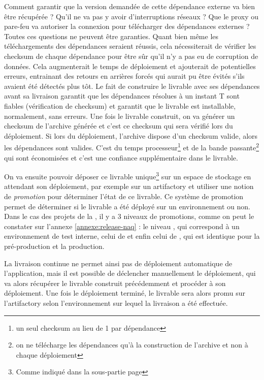 Comment garantir que la version demandée de cette dépendance externe va bien être récupérée ? Qu'il ne va pas y avoir d'interruptions réseaux ? Que le proxy ou pare-feu va autoriser la connexion pour télécharger des dépendances externes ? Toutes ces questions ne peuvent être garanties. Quant bien même les téléchargements des dépendances seraient réussis, cela nécessiterait de vérifier les \gls{checksum} de chaque dépendance pour être sûr qu'il n'y a pas eu de corruption de données. Cela augmenterait le temps de déploiement et ajouterait de potentielles erreurs, entrainant des retours en arrières forcés qui aurait pu être évités s'ils avaient été détectés plus tôt. Le fait de construire le livrable avec ses dépendances avant sa livraison garantit que les dépendances résolues à un instant T sont fiables (vérification de \gls{checksum}) et garantit que le livrable est installable, normalement, sans erreurs. Une fois le livrable construit, on va générer un \gls{checksum} de l'archive générée et c'est ce \gls{checksum} qui sera vérifié lors du déploiement. Si lors du déploiement, l'archive dispose d'un \gls{checksum} valide, alors les dépendances sont valides. C'est du temps processeur\footnote{un seul \gls{checksum} au lieu de 1 par dépendance} et de la bande passante\footnote{on ne télécharge les dépendances qu'à la construction de l'archive et non à chaque déploiement} qui sont économisées et c'est une confiance supplémentaire dans le livrable.

On va ensuite pouvoir déposer ce livrable unique\footnote{Comme indiqué dans la sous-partie  page \pageref{gestion-de-version}} sur un espace de stockage en attendant son déploiement, par exemple sur un \gls{artifactory} et utiliser une notion de \textit{promotion} pour déterminer l'état de ce livrable. Ce système de promotion permet de déterminer si le livrable a été déployé sur un environnement ou non. Dans le cas des projets de la \naq, il y a 3 niveaux de promotions, comme on peut le constater sur l'annexe \ref{annexe:release-naq} : le niveau , qui correspond à un environnement de test interne, celui de  et enfin celui de , qui est identique pour la pré-production et la production.

La livraison continue ne permet ainsi pas de déploiement automatique de l'application, mais il est possible de déclencher manuellement le déploiement, qui va alors récupérer le livrable construit précédemment et procéder à son déploiement. Une fois le déploiement terminé, le livrable sera alors promu sur l'\gls{artifactory} selon l'environnement sur lequel la livraison a été effectuée.

